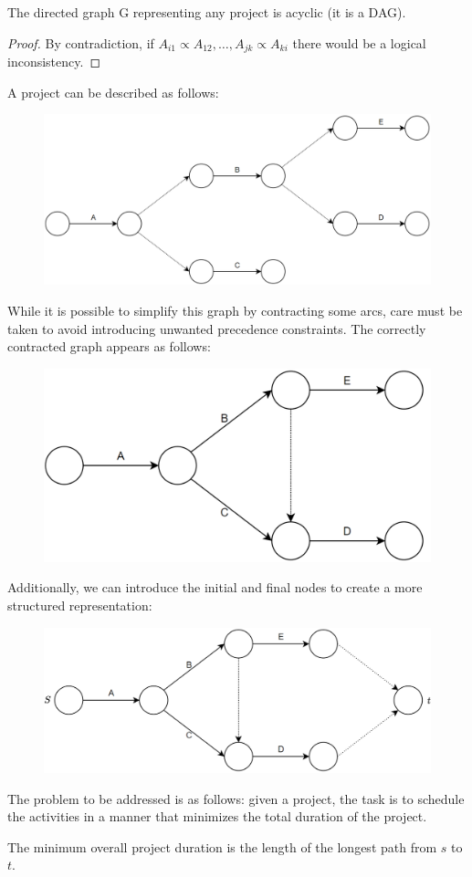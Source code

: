 \begin{property}
    The directed graph G representing any project is acyclic (it is a DAG). 
\end{property}
\begin{proof}
    By contradiction, if $A_{i1}\varpropto A_{12},\dots,A_{jk}\varpropto A_{ki}$ there would be a logical inconsistency. 
\end{proof}  
\begin{example}
    A project can be described as follows:
    \begin{figure}[H]
        \centering
        \includegraphics[width=0.5\linewidth]{images/project.png}
    \end{figure}
    While it is possible to simplify this graph by contracting some arcs, care must be taken to avoid introducing unwanted precedence constraints. 
    The correctly contracted graph appears as follows:
    \begin{figure}[H]
        \centering
        \includegraphics[width=0.4\linewidth]{images/cproject.png}
    \end{figure}
    Additionally, we can introduce the initial and final nodes to create a more structured representation:
    \begin{figure}[H]
        \centering
        \includegraphics[width=0.5\linewidth]{images/fproject.png}
    \end{figure}
\end{example}
The problem to be addressed is as follows: given a project, the task is to schedule the activities in a manner that minimizes the total duration of the project.
\begin{property}
    The minimum overall project duration is the length of the longest path from $s$ to $t$. 
\end{property}
